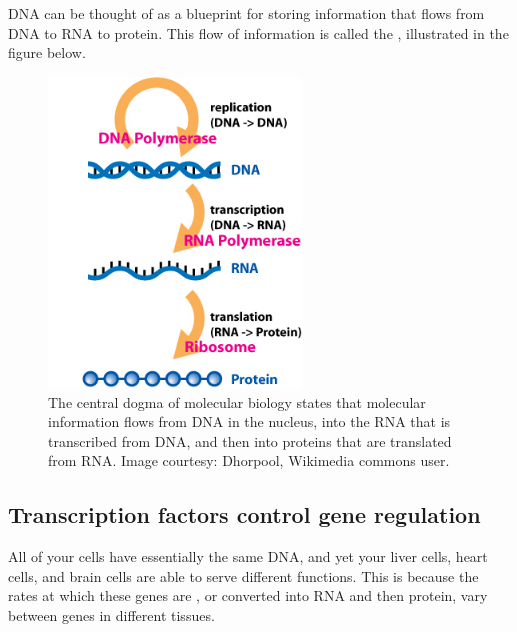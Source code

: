 DNA can be thought of as a blueprint for storing information that flows from DNA to RNA to protein. This flow of information is called the , illustrated in the figure below.

\begin{note}\end{note}

\begin{figure}[h]
\centering
\mySfFamily
\includegraphics[width = 0.6\textwidth]{../assets/images/600px/Central_Dogma_of_Molecular_Biochemistry_with_Enzymes.jpg}
\caption{The central dogma of molecular biology states that molecular information flows from DNA in the nucleus, into the RNA that is transcribed from DNA, and then into proteins that are translated from RNA. Image courtesy: Dhorpool, Wikimedia commons user.}
\label{fig:Central_Dogma_of_Molecular_Biochemistry_with_Enzymes}
\end{figure}

\FloatBarrier
{}
\subsection{Transcription factors control gene regulation}

All of your cells have essentially the same DNA, and yet your liver cells, heart cells, and brain cells are able to serve different functions. This is because the rates at which these genes are , or converted into RNA and then protein, vary between genes in different tissues.

